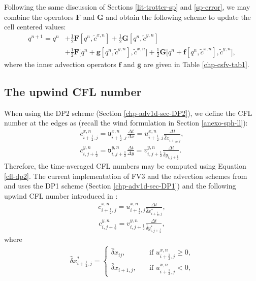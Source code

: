 Following the same discussion of Sections \ref{lit-trotter-sp} and  \ref{sp-error}, we may combine the operators $\mathbf{F}$ and $\mathbf{G}$ and
obtain the following scheme to update the cell centered values:
\begin{align}
	\label{q-split}
	q^{n+1} = q^n &+ \frac{1}{2}\mathbf{F}[q^n,\tilde{c}^{x,n}] + \frac{1}{2}\mathbf{G}[q^n,\tilde{c}^{y,n}]\nonumber \\
	&+\frac{1}{2}\mathbf{F}\bigg[q^n + \mathbf{g}[q^n, \tilde{c}^{y,n}], \tilde{c}^{x,n}\bigg]+
	\frac{1}{2}\mathbf{G}\bigg[q^n + \mathbf{f}[q^n, \tilde{c}^{x,n}], \tilde{c}^{y,n}\bigg],
\end{align}
where the inner advection operators $\mathbf{f}$ and $\mathbf{g}$ are given in Table \ref{chp-csfv-tab1}.

\subsection{The upwind CFL number}
\label{sec-cfl}
When using the DP2 scheme (Section \ref{chp-adv1d-sec-DP2}), we define the CFL number at the edges as (recall the wind formulation in Section \ref{anexo-sph-ll}):
\begin{align}
	\label{cfl_dp2-x}
	{c}_{i+\frac{1}{2},j}^{x,n} = {\mathfrak{u}}_{i+\frac{1}{2},j}^{x,n}\frac{\Delta t}{\Delta x}
	= {{u}}_{i+\frac{1}{2},j}^{x,n}\frac{\Delta t}{\hat{\delta} x_{i+\frac{1}{2},j}},\\
	\label{cfl_dp2-y}
	{c}_{i,j+\frac{1}{2}}^{y,n} = {\mathfrak{v}}_{i,j+\frac{1}{2}}^{y,n}\frac{\Delta t}{\Delta y}
	= {{v}}_{i,j+\frac{1}{2}}^{y,n}\frac{\Delta t}{\hat{\delta} y_{i,j+\frac{1}{2}}}.
\end{align}
Therefore, the time-averaged CFL numbers may be computed using Equation \eqref{cfl-dp2}.
The current implementation of FV3 and the advection schemes from \citet{lin:2004} and \citet{putman:2007}
uses the DP1 scheme (Section \ref{chp-adv1d-sec-DP1}) and the following upwind CFL number introduced in \citet{lin:1994}:
\begin{align}
	\label{cfl_dp1-x}
{c}_{i+\frac{1}{2},j}^{x,n} ={{u}}_{i+\frac{1}{2},j}^{x,n}\frac{{\Delta t}}
{{\hat{\delta} x_{i+\frac{1}{2},j}^*}},
\end{align}
\begin{align}
	\label{cfl_dp1-y}
	{c}_{i,j+\frac{1}{2}}^{y,n} = {{v}}_{i,j+\frac{1}{2}}^{y,n}\frac{{\Delta t}}
	{{\hat{\delta} y_{i,j+\frac{1}{2}}^*}},
\end{align}
where
\begin{align}
	\label{cfl_dp1-dx}
	\hat{\delta} x_{i+\frac{1}{2},j}^*  =
	\begin{cases}
		{\hat{\delta} x_{ij}},
		\quad &\text{if }{{{u}}_{i+\frac{1}{2},j}^{x,n} \ge 0},\\
		{\hat{\delta} x_{i+1,j}}, 
		\quad &\text{if }{{{u}}_{i+\frac{1}{2},j}^{x,n} < 0},
	\end{cases}
\end{align}
